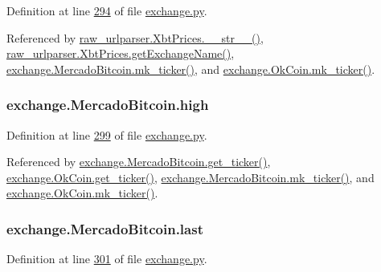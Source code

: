 Definition at line \hyperlink{exchange_8py_source_l00294}{294} of file \hyperlink{exchange_8py_source}{exchange.\+py}.



Referenced by \hyperlink{raw__urlparser_8py_source_l00074}{raw\+\_\+urlparser.\+Xbt\+Prices.\+\_\+\+\_\+str\+\_\+\+\_\+()}, \hyperlink{raw__urlparser_8py_source_l00068}{raw\+\_\+urlparser.\+Xbt\+Prices.\+get\+Exchange\+Name()}, \hyperlink{exchange_8py_source_l00320}{exchange.\+Mercado\+Bitcoin.\+mk\+\_\+ticker()}, and \hyperlink{exchange_8py_source_l00385}{exchange.\+Ok\+Coin.\+mk\+\_\+ticker()}.

\subsubsection[{\texorpdfstring{high}{high}}]{\setlength{\rightskip}{0pt plus 5cm}exchange.\+Mercado\+Bitcoin.\+high}\hypertarget{classexchange_1_1_mercado_bitcoin_a0b9c2d465601a48e3b8838354e931c39}{}\label{classexchange_1_1_mercado_bitcoin_a0b9c2d465601a48e3b8838354e931c39}


Definition at line \hyperlink{exchange_8py_source_l00299}{299} of file \hyperlink{exchange_8py_source}{exchange.\+py}.



Referenced by \hyperlink{exchange_8py_source_l00306}{exchange.\+Mercado\+Bitcoin.\+get\+\_\+ticker()}, \hyperlink{exchange_8py_source_l00371}{exchange.\+Ok\+Coin.\+get\+\_\+ticker()}, \hyperlink{exchange_8py_source_l00320}{exchange.\+Mercado\+Bitcoin.\+mk\+\_\+ticker()}, and \hyperlink{exchange_8py_source_l00385}{exchange.\+Ok\+Coin.\+mk\+\_\+ticker()}.

\subsubsection[{\texorpdfstring{last}{last}}]{\setlength{\rightskip}{0pt plus 5cm}exchange.\+Mercado\+Bitcoin.\+last}\hypertarget{classexchange_1_1_mercado_bitcoin_a5f2759cd17d5dd36bc813c815543f3cc}{}\label{classexchange_1_1_mercado_bitcoin_a5f2759cd17d5dd36bc813c815543f3cc}


Definition at line \hyperlink{exchange_8py_source_l00301}{301} of file \hyperlink{exchange_8py_source}{exchange.\+py}.



